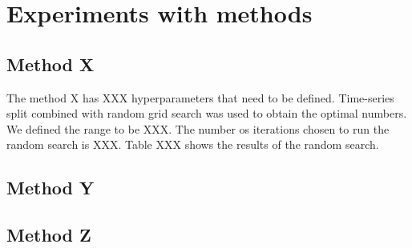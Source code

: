 \section{Experiments with methods}
\label{sec:experiments}

\subsection{Method X}

The method X has XXX hyperparameters that need to be defined. Time-series
split combined with random grid search was used to obtain the optimal numbers.
We defined the range to be XXX. The number os iterations chosen to run the
random search is XXX. Table XXX shows the results of the random search. 

\subsection{Method Y}

\subsection{Method Z}